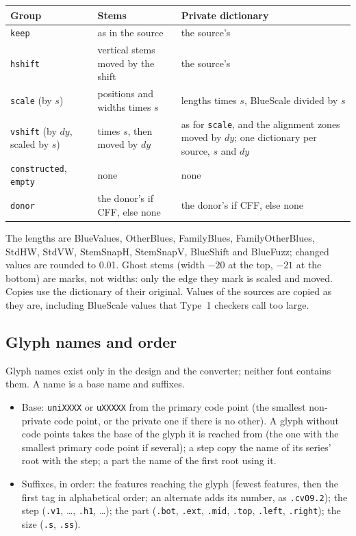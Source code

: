 \documentclass[10pt]{article}
\newcommand\code[1]{\texttt{#1}}
\begin{document}
\begin{center}
\begin{tabularx}{\textwidth}{lXX}
\toprule
Group & Stems & Private dictionary \\
\midrule
\code{keep} & as in the source & the source's \\
\code{hshift} & vertical stems moved by the shift & the source's \\
\code{scale} (by $s$) & positions and widths times $s$ & lengths times
  $s$, BlueScale divided by $s$ \\
\code{vshift} (by $dy$, scaled by $s$) & times $s$, then moved by $dy$
  & as for \code{scale}, and the alignment zones moved by $dy$; one
  dictionary per source, $s$ and $dy$ \\
\code{constructed}, \code{empty} & none & none \\
\code{donor} & the donor's if CFF, else none & the donor's if CFF, else
  none \\
\bottomrule
\end{tabularx}
\end{center}

The lengths are BlueValues, OtherBlues, FamilyBlues, FamilyOtherBlues,
StdHW, StdVW, StemSnapH, StemSnapV, BlueShift and BlueFuzz; changed
values are rounded to 0.01.  Ghost stems (width $-20$ at the top, $-21$
at the bottom) are marks, not widths: only the edge they mark is
scaled and moved.  Copies use the dictionary of their original.  Values
of the sources are copied as they are, including BlueScale values that
Type~1 checkers call too large.


\subsection{Glyph names and order}\label{sec:names}

Glyph names exist only in the design and the converter; neither font
contains them.  A name is a base name and suffixes.

\begin{itemize}
\item Base: \code{uniXXXX} or \code{uXXXXX} from the primary code
  point (the smallest non-private code point, or the private one if
  there is no other).  A glyph without code points takes the base of
  the glyph it is reached from (the one with the smallest primary code
  point if several); a step copy the name of its series' root with the
  step; a part the name of the first root using it.
\item Suffixes, in order: the features reaching the glyph (fewest
  features, then the first tag in alphabetical order; an alternate
  adds its number, as \code{.cv09.2}); the step (\code{.v1}, \dots,
  \code{.h1}, \dots); the part (\code{.bot}, \code{.ext}, \code{.mid},
  \code{.top}, \code{.left}, \code{.right}); the size (\code{.s},
  \code{.ss}).
\end{itemize}
\end{document}
